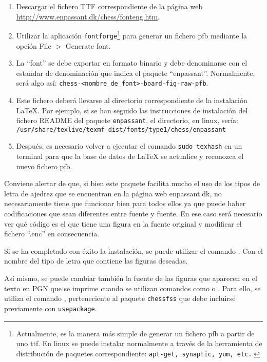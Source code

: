 \documentclass[a4paper,10pt, twocolumn]{article}
\newcommand{\mi}[1]{\texttt{#1}} %
\begin{document}
    \begin{enumerate}
        \item Descargar el fichero TTF correspondiente de la página web \href{http://www.enpassant.dk/chess/fonteng.htm}{http://www.enpassant.dk/chess/fonteng.htm}.
        \item Utilizar la aplicación {\tt fontforge}\footnote{Actualmente, es la manera más simple de generar un fichero pfb a partir de uno ttf. En linux se puede instalar normalmente a través de la herramienta de distribución de paquetes correspondiente: {\tt apt-get, synaptic, yum, etc.}.} para generar un fichero pfb mediante la opción File $>$ Generate font.
        \item La “font” se debe exportar en formato binario y debe denominarse con el estandar de denominación que indica el paquete “enpassant”. Normalmente, será algo así: {\tt \small chess-<nombre\_de\_font>-board-fig-raw-pfb}.
        \item Este fichero deberá llevarse al directorio correspondiente de la instalación LaTeX. Por ejemplo, si se han seguido las instrucciones de instalación del fichero README del paquete {\tt enpassant}, el directorio, en linux, sería: {\tt\scriptsize /usr/share/texlive/texmf-dist/fonts/type1/chess/enpassant}
        \item Después, es necesario volver a ejecutar el comando {\tt sudo texhash} en un terminal para que la base de datos de LaTeX se actualice y reconozca el nuevo fichero pfb.
              \end{enumerate}     
        
        
        Conviene alertar de que, si bien este paquete facilita mucho el uso de los tipos de letra de ajedrez que se encuentran en la página web enpassant.dk, no necesariamente tiene que funcionar bien para todos ellos ya que puede haber codificaciones que sean diferentes entre fuente y fuente. En ese caso será necesario ver qué código es el que tiene una figura en la fuente original y modificar el fichero “.enc” en consecuencia.
        
        Si se ha completado con éxito la instalación, se puede utilizar el comando {\scriptsize \mi{}}. Con el nombre del tipo de letra que contiene las figuras deseadas.
        
        Así mismo, se puede cambiar también la fuente de las figuras que aparecen en el texto en PGN que se imprime cuando se utilizan comandos como \mi{\mainline} o \mi{\variation}. Para ello, se utiliza el comando \mi{\setfigfontfamily}, perteneciente al paquete {\tt chessfss} que debe incluirse previamente con {\tt usepackage}.
        
\end{document}
